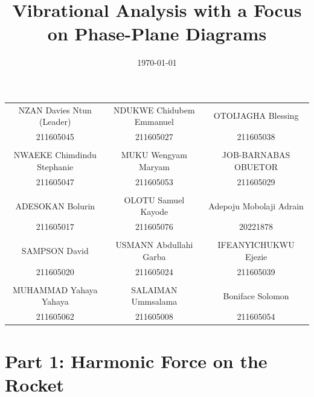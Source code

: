 \documentclass[12pt,a4paper]{article}
\title{\textbf{Vibrational Analysis with a Focus on Phase-Plane Diagrams}}
\date{\today}
\begin{document}
\maketitle

\begin{center}
    \small
    \begin{tabular}{c c c}
        NZAN Davies Ntun (Leader) & NDUKWE Chidubem Emmanuel & OTOIJAGHA Blessing \\
        211605045 & 211605027 & 211605038 \\
        & & \\
        NWAEKE Chimdindu Stephanie & MUKU Wengyam Maryam & JOB-BARNABAS OBUETOR \\
        211605047 & 211605053 & 211605029 \\
        & & \\
        ADESOKAN Bolurin & OLOTU Samuel Kayode & Adepoju Mobolaji Adrain \\
        211605017 & 211605076 & 20221878 \\
        & & \\
        SAMPSON David & USMANN Abdullahi Garba & IFEANYICHUKWU Ejezie \\
        211605020 & 211605024 & 211605039 \\
        & & \\
        MUHAMMAD Yahaya Yahaya & SALAIMAN Ummsalama & Boniface Solomon \\
        211605062 & 211605008 & 211605054 \\
    \end{tabular}
\end{center}

\tableofcontents
\newpage

\section{Part 1: Harmonic Force on the Rocket}
\end{document}
